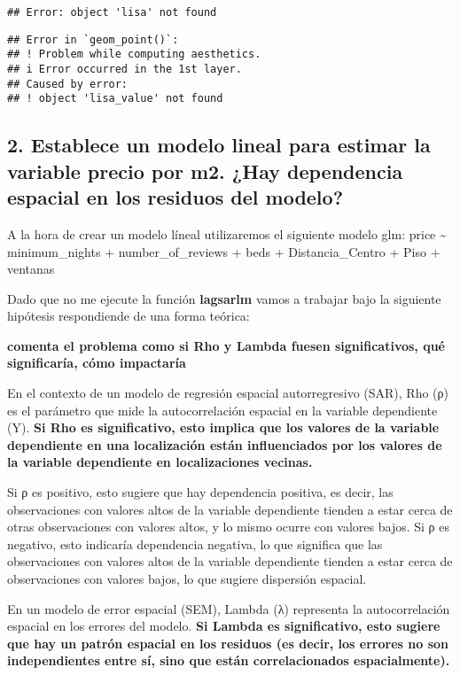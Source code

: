 \documentclass[
]{article}
\begin{document}
\begin{verbatim}
## Error: object 'lisa' not found
\end{verbatim}

\begin{verbatim}
## Error in `geom_point()`:
## ! Problem while computing aesthetics.
## i Error occurred in the 1st layer.
## Caused by error:
## ! object 'lisa_value' not found
\end{verbatim}

\subsection{2. Establece un modelo lineal para estimar la variable
precio por m2. ¿Hay dependencia espacial en los residuos del
modelo?}\label{establece-un-modelo-lineal-para-estimar-la-variable-precio-por-m2.-hay-dependencia-espacial-en-los-residuos-del-modelo}

A la hora de crear un modelo líneal utilizaremos el siguiente modelo
glm: price \textasciitilde{} minimum\_nights + number\_of\_reviews +
beds + Distancia\_Centro + Piso + ventanas

Dado que no me ejecute la función \textbf{lagsarlm} vamos a trabajar
bajo la siguiente hipótesis respondiende de una forma teórica:

\textbf{comenta el problema como si Rho y Lambda fuesen significativos,
qué significaría, cómo impactaría}

En el contexto de un modelo de regresión espacial autorregresivo (SAR),
Rho (ρ) es el parámetro que mide la autocorrelación espacial en la
variable dependiente (Y). \textbf{Si Rho es significativo, esto implica
que los valores de la variable dependiente en una localización están
influenciados por los valores de la variable dependiente en
localizaciones vecinas.}

Si ρ es positivo, esto sugiere que hay dependencia positiva, es decir,
las observaciones con valores altos de la variable dependiente tienden a
estar cerca de otras observaciones con valores altos, y lo mismo ocurre
con valores bajos. Si ρ es negativo, esto indicaría dependencia
negativa, lo que significa que las observaciones con valores altos de la
variable dependiente tienden a estar cerca de observaciones con valores
bajos, lo que sugiere dispersión espacial.

En un modelo de error espacial (SEM), Lambda (λ) representa la
autocorrelación espacial en los errores del modelo. \textbf{Si Lambda es
significativo, esto sugiere que hay un patrón espacial en los residuos
(es decir, los errores no son independientes entre sí, sino que están
correlacionados espacialmente).}
\end{document}
